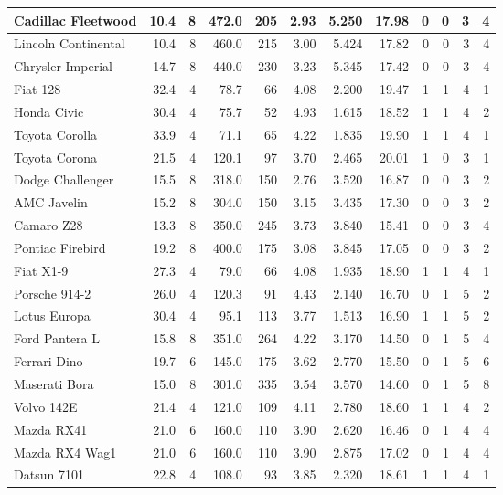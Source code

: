 \documentclass[
  letterpaper,
  DIV=11,
  numbers=noendperiod]{scrartcl}
\begin{document}
\begin{longtable}[t]{l|r|r|r|r|r|r|r|r|r|r|r}
\hline
Cadillac Fleetwood & 10.4 & 8 & 472.0 & 205 & 2.93 & 5.250 & 17.98 & 0 & 0 & 3 & 4\\
\hline
Lincoln Continental & 10.4 & 8 & 460.0 & 215 & 3.00 & 5.424 & 17.82 & 0 & 0 & 3 & 4\\
\hline
Chrysler Imperial & 14.7 & 8 & 440.0 & 230 & 3.23 & 5.345 & 17.42 & 0 & 0 & 3 & 4\\
\hline
Fiat 128 & 32.4 & 4 & 78.7 & 66 & 4.08 & 2.200 & 19.47 & 1 & 1 & 4 & 1\\
\hline
Honda Civic & 30.4 & 4 & 75.7 & 52 & 4.93 & 1.615 & 18.52 & 1 & 1 & 4 & 2\\
\hline
Toyota Corolla & 33.9 & 4 & 71.1 & 65 & 4.22 & 1.835 & 19.90 & 1 & 1 & 4 & 1\\
\hline
Toyota Corona & 21.5 & 4 & 120.1 & 97 & 3.70 & 2.465 & 20.01 & 1 & 0 & 3 & 1\\
\hline
Dodge Challenger & 15.5 & 8 & 318.0 & 150 & 2.76 & 3.520 & 16.87 & 0 & 0 & 3 & 2\\
\hline
AMC Javelin & 15.2 & 8 & 304.0 & 150 & 3.15 & 3.435 & 17.30 & 0 & 0 & 3 & 2\\
\hline
Camaro Z28 & 13.3 & 8 & 350.0 & 245 & 3.73 & 3.840 & 15.41 & 0 & 0 & 3 & 4\\
\hline
Pontiac Firebird & 19.2 & 8 & 400.0 & 175 & 3.08 & 3.845 & 17.05 & 0 & 0 & 3 & 2\\
\hline
Fiat X1-9 & 27.3 & 4 & 79.0 & 66 & 4.08 & 1.935 & 18.90 & 1 & 1 & 4 & 1\\
\hline
Porsche 914-2 & 26.0 & 4 & 120.3 & 91 & 4.43 & 2.140 & 16.70 & 0 & 1 & 5 & 2\\
\hline
Lotus Europa & 30.4 & 4 & 95.1 & 113 & 3.77 & 1.513 & 16.90 & 1 & 1 & 5 & 2\\
\hline
Ford Pantera L & 15.8 & 8 & 351.0 & 264 & 4.22 & 3.170 & 14.50 & 0 & 1 & 5 & 4\\
\hline
Ferrari Dino & 19.7 & 6 & 145.0 & 175 & 3.62 & 2.770 & 15.50 & 0 & 1 & 5 & 6\\
\hline
Maserati Bora & 15.0 & 8 & 301.0 & 335 & 3.54 & 3.570 & 14.60 & 0 & 1 & 5 & 8\\
\hline
Volvo 142E & 21.4 & 4 & 121.0 & 109 & 4.11 & 2.780 & 18.60 & 1 & 1 & 4 & 2\\
\hline
Mazda RX41 & 21.0 & 6 & 160.0 & 110 & 3.90 & 2.620 & 16.46 & 0 & 1 & 4 & 4\\
\hline
Mazda RX4 Wag1 & 21.0 & 6 & 160.0 & 110 & 3.90 & 2.875 & 17.02 & 0 & 1 & 4 & 4\\
\hline
Datsun 7101 & 22.8 & 4 & 108.0 & 93 & 3.85 & 2.320 & 18.61 & 1 & 1 & 4 & 1\\

\end{longtable}
\end{document}
